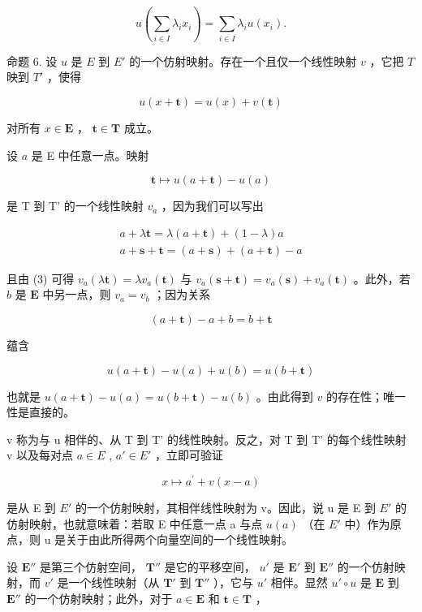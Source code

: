 \[
u \left(\sum_ {i \in I} \lambda_ {i} x _ {i}\right) = \sum_ {i \in I} \lambda_ {i} u (x _ {i}).\tag{3}
\]

命题 6. 设 \(u\) 是 \(E\) 到 \(E'\) 的一个仿射映射。存在一个且仅一个线性映射 \(v\) ，它把 \(T\) 映到 \(T'\) ，使得

\[
u (x + \mathbf {t}) = u (x) + v (\mathbf {t})
\]

对所有 \(x \in \mathbf{E}\) ， \(\mathbf{t} \in \mathbf{T}\) 成立。

设 \(a\) 是 E 中任意一点。映射

\[
\mathbf {t} \mapsto u (a + \mathbf {t}) - u (a)
\]

是 T 到 T' 的一个线性映射 \(v_{a}\) ，因为我们可以写出

\[
\begin{array}{c} a + \lambda \mathbf {t} = \lambda (a + \mathbf {t}) + (1 - \lambda) a \\ a + \mathbf {s} + \mathbf {t} = (a + \mathbf {s}) + (a + \mathbf {t}) - a \end{array}
\]

且由 (3) 可得 \(v_{a}(\lambda \mathbf{t}) = \lambda v_{a}(\mathbf{t})\) 与 \(v_{a}(\mathbf{s} + \mathbf{t}) = v_{a}(\mathbf{s}) + v_{a}(\mathbf{t})\) 。此外，若 \(b\) 是 \(\mathbf{E}\) 中另一点，则 \(v_{a} = v_{b}\) ；因为关系

\[
(a + \mathbf {t}) - a + b = b + \mathbf {t}
\]

蕴含

\[
u (a + \mathbf {t}) - u (a) + u (b) = u (b + \mathbf {t})
\]

也就是 \(u(a + \mathbf{t}) - u(a) = u(b + \mathbf{t}) - u(b)\) 。由此得到 \(v\) 的存在性；唯一性是直接的。

v 称为与 u 相伴的、从 T 到 T' 的线性映射。反之，对 T 到 T' 的每个线性映射 v 以及每对点 \(a \in E\) , \(a' \in E'\) ，立即可验证

\[
x \mapsto a ^ {\prime} + v (x - a)
\]

是从 E 到 \(E'\) 的一个仿射映射，其相伴线性映射为 v。因此，说 u 是 E 到 \(E'\) 的仿射映射，也就意味着：若取 E 中任意一点 a 与点 \(u(a)\) （在 \(E'\) 中）作为原点，则 u 是关于由此所得两个向量空间的一个线性映射。

设 \(\mathbf{E}''\) 是第三个仿射空间， \(\mathbf{T}''\) 是它的平移空间， \(u'\) 是 \(\mathbf{E}'\) 到 \(\mathbf{E}''\) 的一个仿射映射，而 \(v'\) 是一个线性映射（从 \(\mathbf{T}'\) 到 \(\mathbf{T}''\) ），它与 \(u'\) 相伴。显然 \(u' \circ u\) 是 \(\mathbf{E}\) 到 \(\mathbf{E}''\) 的一个仿射映射；此外，对于 \(a \in \mathbf{E}\) 和 \(\mathbf{t} \in \mathbf{T}\) ，

